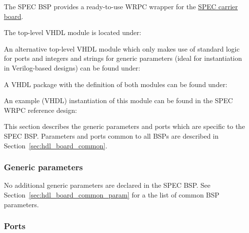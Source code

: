The SPEC BSP provides a ready-to-use WRPC wrapper for the
\href{http://www.ohwr.org/projects/spec}{SPEC carrier board}.

The top-level VHDL module is located under: \\

An alternative top-level VHDL module which only makes use of standard logic for ports and integers
and strings for generic parameters (ideal for instantiation in Verilog-based designs) can be found
under: \\

A VHDL package with the definition of both modules can be found under:
\\

An example (VHDL) instantiation of this module can be found in the SPEC WRPC reference design:
\\

This section describes the generic parameters and ports which are specific to the SPEC BSP.
Parameters and ports common to all BSPs are described in Section~\ref{sec:hdl_board_common}.

\subsubsection{Generic parameters}

No additional generic parameters are declared in the SPEC BSP. See
Section~\ref{sec:hdl_board_common_param} for a the list of common BSP parameters.


\subsubsection{Ports}

